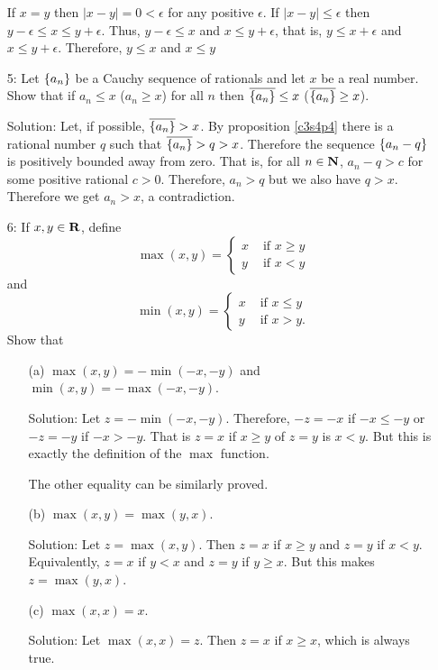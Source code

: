 \begin{enumerate}
If $x = y$ then $|x - y| = 0 < \epsilon$ for any positive $\epsilon$. If
$|x - y| \le \epsilon$ then $y - \epsilon \le x \le y + \epsilon$. Thus,
$y - \epsilon \le x$ and $x \le y + \epsilon$, that is, $y \le x + 
\epsilon$ and $x \le y + \epsilon$. Therefore, $y \le x$ and $x \le y$

\item[5:] Let $\{a_n\}$ be a Cauchy sequence of rationals and let $x$ be
a real number. Show that if $a_n \le x$ ($a_n \ge x$) for all $n$ then 
$\overline{\{a_n\}} \le x$ ($\overline{\{a_n\}} \ge x$).
\item[Solution:] Let, if possible, $\overline{\{a_n\}} > x$. By 
proposition \ref{c3s4p4} there is a rational number $q$ such that 
$\overline{\{a_n\}} > q > x$. Therefore the sequence $\{a_n - q\}$ is
positively bounded away from zero. That is, for all $n \in \mathbf{N}$, $a_n -
q > c$ for some positive rational $c > 0$. Therefore, $a_n > q$ but we
also have $q > x$. Therefore we get $a_n > x$, a contradiction.

\item[6:] If $x, y \in \mathbf{R}$, define 
\[
\max(x, y) = \begin{cases}
x & \text{ if } x \ge y \\
y & \text{ if } x < y
\end{cases}
\]
and
\[
\min(x, y) = \begin{cases}
x & \text{ if } x \le y \\
y & \text{ if } x > y.
\end{cases}
\] 
Show that
\begin{enumerate}
\item[(a)] $\max(x, y) = -\min(-x, -y)$ and $\min(x, y) = -\max(-x, -y)$.
\item[Solution:] Let $z = -\min(-x, -y)$. Therefore, $-z = -x$ if $-x \le 
-y$ or $-z = -y$ if $-x > -y$. That is $z = x$ if $x \ge y$ of $z = y$ is
$x < y$. But this is exactly the definition of the $\max$ function.

The other equality can be similarly proved.

\item[(b)] $\max(x, y) = \max(y, x)$. 
\item[Solution:] Let $z = \max(x, y)$. Then $z = x$
if $x \ge y$ and $z = y$ if $x < y$. Equivalently, $z = x$ if $y < x$ and 
$z = y$ if $y \ge x$. But this makes $z = \max(y, x)$.

\item[(c)] $\max(x, x) = x$.
\item[Solution:] Let $\max(x, x) = z$. Then $z = x$ if $x \ge x$, which is
always true.


\end{enumerate}
\end{enumerate}
